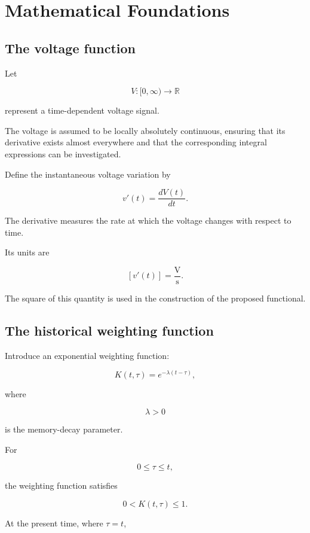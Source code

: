\documentclass[12pt]{article}
\theoremstyle{definition}
\theoremstyle{remark}
\begin{document}
\section{Mathematical Foundations}

\subsection{The voltage function}

Let

\[
V:[0,\infty)\rightarrow\mathbb{R}
\]

represent a time-dependent voltage signal.

The voltage is assumed to be locally absolutely
continuous, ensuring that its derivative exists
almost everywhere and that the corresponding
integral expressions can be investigated.

Define the instantaneous voltage variation by

\begin{equation}
v'(t)=\frac{dV(t)}{dt}.
\label{eq:voltage-derivative}
\end{equation}

The derivative measures the rate at which
the voltage changes with respect to time.

Its units are

\[
[v'(t)]=\frac{\mathrm{V}}{\mathrm{s}}.
\]

The square of this quantity is used in the
construction of the proposed functional.

\subsection{The historical weighting function}

Introduce an exponential weighting function:

\begin{equation}
K(t,\tau)=e^{-\lambda(t-\tau)},
\label{eq:kernel}
\end{equation}

where

\[
\lambda>0
\]

is the memory-decay parameter.

For

\[
0\leq\tau\leq t,
\]

the weighting function satisfies

\[
0<K(t,\tau)\leq1.
\]

At the present time, where \(\tau=t\),
\end{document}

